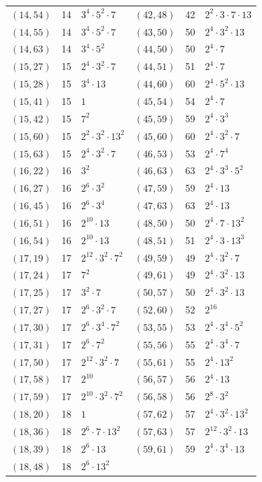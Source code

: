 \documentclass[11pt]{article}
\begin{document}
\begin{longtable}{@{}lrl@{\qquad}lrl@{}}
$(14,54)$ & 14 & $3^{4}\cdot 5^{2}\cdot 7$ & $(42,48)$ & 42 & $2^{2}\cdot 3\cdot 7\cdot 13$\\
$(14,55)$ & 14 & $3^{4}\cdot 5^{2}\cdot 7$ & $(43,50)$ & 50 & $2^{4}\cdot 3^{2}\cdot 13$\\
$(14,63)$ & 14 & $3^{4}\cdot 5^{2}$ & $(44,50)$ & 50 & $2^{4}\cdot 7$\\
$(15,27)$ & 15 & $2^{4}\cdot 3^{2}\cdot 7$ & $(44,51)$ & 51 & $2^{4}\cdot 7$\\
$(15,28)$ & 15 & $3^{4}\cdot 13$ & $(44,60)$ & 60 & $2^{4}\cdot 5^{2}\cdot 13$\\
$(15,41)$ & 15 & $1$ & $(45,54)$ & 54 & $2^{4}\cdot 7$\\
$(15,42)$ & 15 & $7^{2}$ & $(45,59)$ & 59 & $2^{4}\cdot 3^{3}$\\
$(15,60)$ & 15 & $2^{2}\cdot 3^{2}\cdot 13^{2}$ & $(45,60)$ & 60 & $2^{4}\cdot 3^{2}\cdot 7$\\
$(15,63)$ & 15 & $2^{4}\cdot 3^{2}\cdot 7$ & $(46,53)$ & 53 & $2^{4}\cdot 7^{4}$\\
$(16,22)$ & 16 & $3^{2}$ & $(46,63)$ & 63 & $2^{4}\cdot 3^{3}\cdot 5^{2}$\\
$(16,27)$ & 16 & $2^{6}\cdot 3^{2}$ & $(47,59)$ & 59 & $2^{4}\cdot 13$\\
$(16,45)$ & 16 & $2^{6}\cdot 3^{4}$ & $(47,63)$ & 63 & $2^{4}\cdot 13$\\
$(16,51)$ & 16 & $2^{10}\cdot 13$ & $(48,50)$ & 50 & $2^{4}\cdot 7\cdot 13^{2}$\\
$(16,54)$ & 16 & $2^{10}\cdot 13$ & $(48,51)$ & 51 & $2^{4}\cdot 3\cdot 13^{3}$\\
$(17,19)$ & 17 & $2^{12}\cdot 3^{2}\cdot 7^{2}$ & $(49,59)$ & 49 & $2^{4}\cdot 3^{2}\cdot 7$\\
$(17,24)$ & 17 & $7^{2}$ & $(49,61)$ & 49 & $2^{4}\cdot 3^{2}\cdot 13$\\
$(17,25)$ & 17 & $3^{2}\cdot 7$ & $(50,57)$ & 50 & $2^{4}\cdot 3^{2}\cdot 13$\\
$(17,27)$ & 17 & $2^{6}\cdot 3^{2}\cdot 7$ & $(52,60)$ & 52 & $2^{16}$\\
$(17,30)$ & 17 & $2^{6}\cdot 3^{4}\cdot 7^{2}$ & $(53,55)$ & 53 & $2^{4}\cdot 3^{4}\cdot 5^{2}$\\
$(17,31)$ & 17 & $2^{6}\cdot 7^{2}$ & $(55,56)$ & 55 & $2^{4}\cdot 3^{4}\cdot 7$\\
$(17,50)$ & 17 & $2^{12}\cdot 3^{2}\cdot 7$ & $(55,61)$ & 55 & $2^{4}\cdot 13^{2}$\\
$(17,58)$ & 17 & $2^{10}$ & $(56,57)$ & 56 & $2^{4}\cdot 13$\\
$(17,59)$ & 17 & $2^{10}\cdot 3^{2}\cdot 7^{2}$ & $(56,58)$ & 56 & $2^{8}\cdot 3^{2}$\\
$(18,20)$ & 18 & $1$ & $(57,62)$ & 57 & $2^{4}\cdot 3^{2}\cdot 13^{2}$\\
$(18,36)$ & 18 & $2^{6}\cdot 7\cdot 13^{2}$ & $(57,63)$ & 57 & $2^{12}\cdot 3^{2}\cdot 13$\\
$(18,39)$ & 18 & $2^{6}\cdot 13$ & $(59,61)$ & 59 & $2^{4}\cdot 3^{4}\cdot 13$\\
$(18,48)$ & 18 & $2^{6}\cdot 13^{2}$ & & &\\
\end{longtable}
\endgroup
\end{document}
